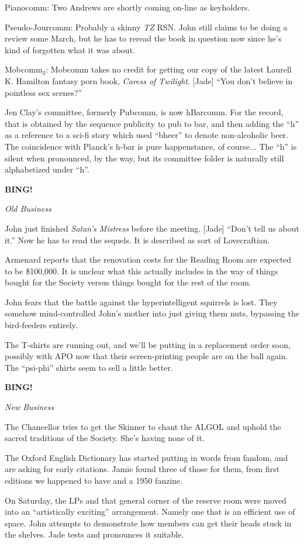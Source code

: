 \documentclass[12pt]{article}
\newcommand{\bing}{{\bf BING!} }
\newcommand{\goto}[1]{\bing \vskip 12pt \centerline{{\em{#1}}}}
\begin{document}
Pianocomm: Two Andrews are shortly coming on-line as keyholders.

Pseudo-Jourcomm: Probably a skinny {\em TZ} RSN.  John still claims
to be doing a review some March, but he has to reread the book in
question now since he's kind of forgotten what it was about.

Mobcomm$_3$: Mobcomm takes no credit for getting our copy of the
latest Laurell K. Hamilton fantasy porn book, {\em Caress of
Twilight}.  [Jade] ``You don't believe in pointless sex scenes?''

Jen Clay's committee, formerly Pubcomm, is now hBarcomm.  For the
record, that is obtained by the sequence publicity to pub to bar,
and then adding the ``h'' as a reference to a sci-fi story which
used ``bheer'' to denote non-alcoholic beer.  The coincidence with
Planck's h-bar is pure happenstance, of course...  The ``h'' is
silent when pronounced, by the way, but its committee folder is
naturally still alphabetized under ``h''.

\goto{Old Business}

John just finished {\em Satan's Mistress} before the meeting.
[Jade] ``Don't tell us about it.''  Now he has to read the sequels.
It is described as sort of Lovecraftian.

Armenard reports that the renovation costs for the Reading Room
are expected to be \$100,000.  It is unclear what this actually
includes in the way of things bought for the Society versus things
bought for the rest of the room.

John fears that the battle against the hyperintelligent squirrels
is lost.  They somehow mind-controlled John's mother into just giving
them nuts, bypassing the bird-feeders entirely.

The T-shirts are running out, and we'll be putting in a replacement
order soon, possibly with APO now that their screen-printing people
are on the ball again.  The ``psi-phi'' shirts seem to sell a little
better.

\goto{New Business}

The Chancellor tries to get the Skinner to chant the ALGOL and
uphold the sacred traditions of the Society.  She's having none of it.

The Oxford English Dictionary has started putting in words from fandom,
and are asking for early citations.  Jamie found three of those for
them, from first editions we happened to have and a 1950 fanzine.

On Saturday, the LPs and that general corner of the reserve room were
moved into an ``artistically exciting'' arrangement.  Namely one that
is an efficient use of space.  John attempts to demonstrate how members
can get their heads stuck in the shelves.  Jade tests and pronounces
it suitable.
\end{document}
